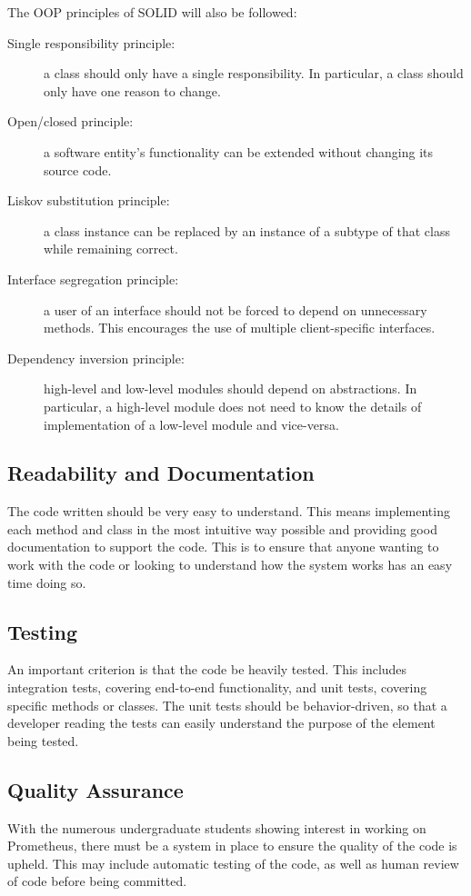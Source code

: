 \documentclass[titlepage,11pt]{article}
\begin{document}
The OOP principles of SOLID \cite{martin_2009} will also be followed:

\begin{description}
	\item[Single responsibility principle:] a class should only have a single responsibility. In particular, a class should only have one reason to change.
	
	\item[Open/closed principle:] a software entity's functionality can be extended without changing its source code.
	
	\item[Liskov substitution principle:] a class instance can be replaced by an instance of a subtype of that class while remaining correct.
	
	\item[Interface segregation principle:] a user of an interface should not be forced to depend on unnecessary methods. This encourages the use of multiple client-specific interfaces.
	
	\item[Dependency inversion principle:] high-level and low-level modules should depend on abstractions. In particular, a high-level module does not need to know the details of implementation of a low-level module and vice-versa.
\end{description}

\subsection{Readability and Documentation}
The code written should be very easy to understand. This means implementing each method and class in the most intuitive way possible and providing good documentation to support the code. This is to ensure that anyone wanting to work with the code or looking to understand how the system works has an easy time doing so.

\subsection{Testing}
An important criterion is that the code be heavily tested. This includes integration tests, covering end-to-end functionality, and unit tests, covering specific methods or classes. The unit tests should be behavior-driven, so that a developer reading the tests can easily understand the purpose of the element being tested.

\subsection{Quality Assurance}
With the numerous undergraduate students showing interest in working on Prometheus, there must be a system in place to ensure the quality of the code is upheld. This may include automatic testing of the code, as well as human review of code before being committed.
\end{document}
